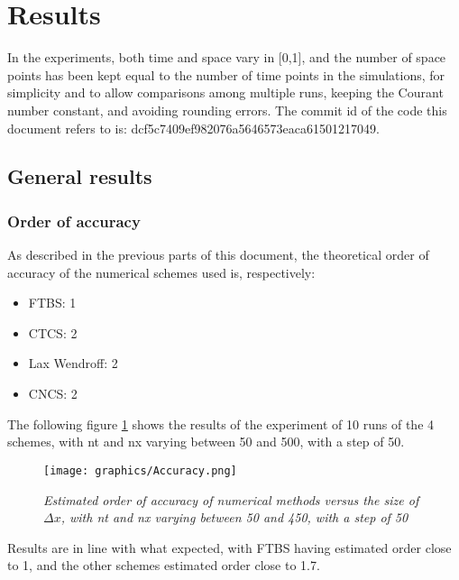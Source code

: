 

\section{Results}
In the experiments, both time and space vary in [0,1], and the number of space points has been kept equal to the number of time points in the simulations, for simplicity and to allow comparisons among multiple runs, keeping the Courant number constant, and avoiding rounding errors. The commit id of the code this document refers to is: dcf5c7409ef982076a5646573eaca61501217049.

\subsection{General results}

\subsubsection{Order of accuracy}
As described in the previous parts of this document, the theoretical order of accuracy of the numerical schemes used is, respectively:
\begin{itemize}
	\item FTBS: 1
	\item CTCS: 2
	\item Lax Wendroff: 2
	\item CNCS: 2
\end{itemize}
The following figure \ref{fig:orderofacc} shows the results of the experiment of 10 runs of the 4 schemes, with nt and nx varying between 50 and 500, with a step of 50.
\begin{figure}[H]
	\begin{center}
		\texttt{[image: graphics/Accuracy.png]}
	\end{center}%
	\caption[Order of accuracy of numerical methods]{ \em Estimated order of accuracy of numerical methods versus the size of $\Delta x$, with nt and nx varying between 50 and 450, with a step of 50}
	\label{fig:orderofacc}
\end{figure}
Results are in line with what expected, with FTBS having estimated order close to 1, and the other schemes estimated order close to 1.7.


